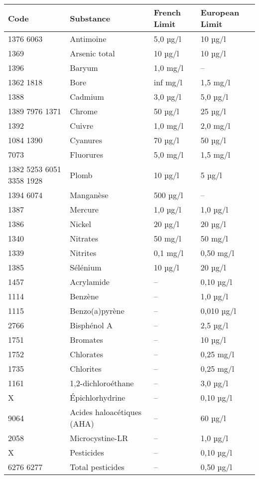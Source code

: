 \documentclass{article}
\begin{document}
\begin{table}[h!]
\centering
\begin{tabular}{|l|l|l|l|}
\hline
\textbf{Code} & \textbf{Substance} & \textbf{French Limit} & \textbf{European Limit} \\
\hline
1376 6063 & Antimoine & 5,0 µg/l & 10 µg/l \\
1369 & Arsenic total & 10 µg/l & 10 µg/l \\
1396 & Baryum & 1,0 mg/l & -- \\
1362 1818 & Bore & inf mg/l & 1,5 mg/l \\
1388 & Cadmium & 3,0 µg/l & 5,0 µg/l \\
1389 7976 1371 & Chrome & 50 µg/l & 25 µg/l \\
1392 & Cuivre & 1,0 mg/l & 2,0 mg/l \\
1084 1390 & Cyanures & 70 µg/l & 50 µg/l \\
7073 & Fluorures & 5,0 mg/l & 1,5 mg/l \\
1382 5253 6051 3358 1928 & Plomb & 10 µg/l & 5 µg/l \\
1394 6074 & Manganèse & 500 µg/l & -- \\
1387 & Mercure & 1,0 µg/l & 1,0 µg/l \\
1386 & Nickel & 20 µg/l & 20 µg/l \\
1340 & Nitrates & 50 mg/l & 50 mg/l \\
1339 & Nitrites & 0,1 mg/l & 0,50 mg/l \\
1385 & Sélénium & 10 µg/l & 20 µg/l \\
1457 & Acrylamide & -- & 0,10 µg/l \\
1114 & Benzène & -- & 1,0 µg/l \\
1115 & Benzo(a)pyrène & -- & 0,010 µg/l \\
2766 & Bisphénol A & -- & 2,5 µg/l \\
1751 & Bromates & -- & 10 µg/l \\
1752 & Chlorates & -- & 0,25 mg/l \\
1735 & Chlorites & -- & 0,25 mg/l \\
1161 & 1,2-dichloroéthane & -- & 3,0 µg/l \\
X & Épichlorhydrine & -- & 0,10 µg/l \\
9064 & Acides haloacétiques (AHA) & -- & 60 µg/l \\
2058 & Microcystine-LR & -- & 1,0 µg/l \\
X & Pesticides & -- & 0,10 µg/l \\
6276 6277 & Total pesticides & -- & 0,50 µg/l \\

\end{tabular}
\end{table}
\end{document}
